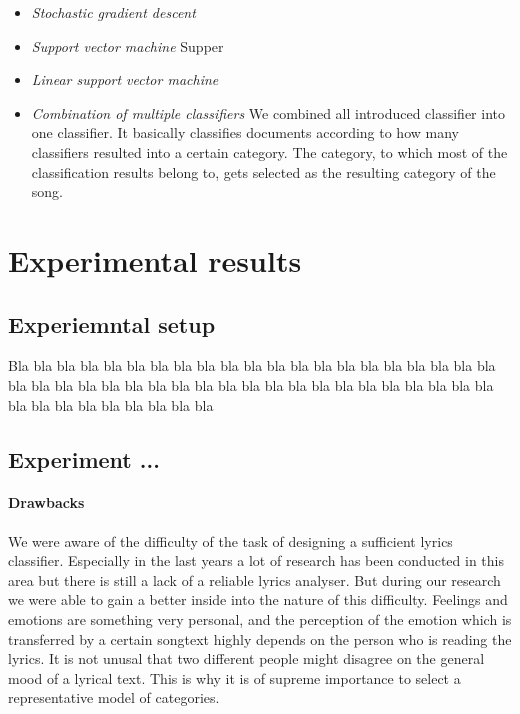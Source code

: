 \documentclass[a4paper,12pt]{article}
\begin{document}
\begin{itemize}
\item \textit{Stochastic gradient descent}

\item \textit{Support vector machine}
Supper 
\item \textit{Linear support vector machine}
\item \textit{Combination of multiple classifiers} We combined all introduced classifier into one classifier. It basically classifies documents according to how many classifiers resulted into a certain category. The category, to which most of the classification results belong to, gets selected as the resulting category of the song.
\end{itemize}

\section{Experimental results}
\label{sec:exps}

 

\subsection{Experiemntal setup}
Bla bla bla bla bla bla bla bla bla bla bla bla bla bla bla bla bla 
bla bla bla bla bla bla bla bla bla bla bla bla bla bla bla bla bla 
bla bla bla bla bla bla bla bla bla bla bla bla bla bla bla bla bla 

\subsection{Experiment ...}

\paragraph{Drawbacks} We were aware of the difficulty of the task of designing a sufficient lyrics classifier. Especially in the last years a lot of research has been conducted in this area but there is still a lack of a reliable lyrics analyser. But during our research we were able to gain a better inside into the nature of this difficulty. Feelings and emotions are something very personal, and the perception of the emotion which is transferred by a certain songtext highly depends on the person who is reading the lyrics. It is not unusal that two different people might disagree on the general mood of a lyrical text. This is why it is of supreme importance to select a representative model of categories.
\end{document}
